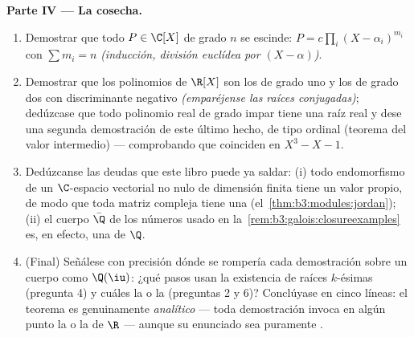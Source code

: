 \begin{problem}
\medskip
\noindent\textbf{Parte IV --- La cosecha.}
\begin{enumerate}[resume]
  \item Demostrar que todo $P \in \C[X]$ de grado $n$ se escinde:
  $P = c\prod_{i}(X - \alpha_i)^{m_i}$ con $\sum m_i =
        n$ \emph{(inducción, división euclídea por $(X -
        \alpha)$)}. \item Demostrar que los polinomios
   de $\R[X]$ son los de
  grado uno y los de grado dos con discriminante negativo
  \emph{(emparéjense las raíces conjugadas)}; dedúzcase que todo
  polinomio real de grado impar tiene una raíz real y dese una segunda
  demostración de este último hecho, de tipo ordinal (teorema del valor
  intermedio) --- comprobando que coinciden en $X^3 - X - 1$. \item
  Dedúzcanse las deudas que este libro puede ya saldar: (i) todo
  endomorfismo de un $\C$-espacio vectorial no nulo de dimensión finita
  tiene un valor propio, de modo que toda matriz compleja tiene una
  (el~\cref{thm:b3:modules:jordan}); (ii) el cuerpo $\bar\Q$ de los
  números  usado en
  la~\cref{rem:b3:galois:closureexamples} es, en efecto, una
   de $\Q$. \item
  (Final) Señálese con precisión dónde se rompería cada demostración
  sobre un cuerpo como $\Q(\iu)$: ¿qué pasos usan la existencia de
  raíces $k$-ésimas (pregunta 4) y cuáles la  o la
   (preguntas 2 y 6)?
  Conclúyase en cinco líneas: el teorema es genuinamente
  \emph{analítico} --- toda demostración invoca en algún punto la
   o la
   de $\R$ --- aunque su
  enunciado sea puramente .
\end{enumerate}


\end{problem}
